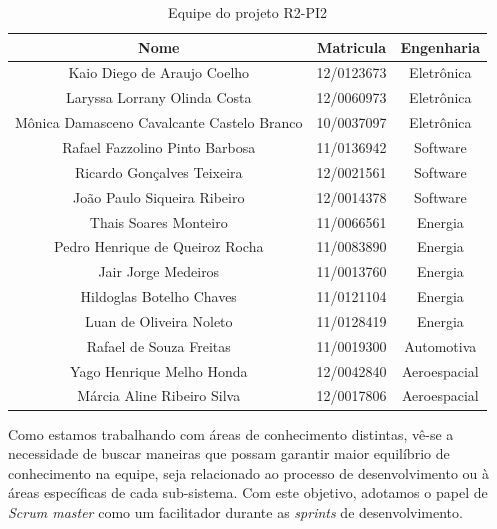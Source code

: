 	\begin{table}[H]
	\centering
	\caption{Equipe do projeto R2-PI2}
	\label{tab:equipe}
	\begin{tabular}{|c|c|c|}
	\hline
	\textbf{Nome}                              & \textbf{Matricula} & \textbf{Engenharia} \\ \hline
	Kaio Diego de Araujo Coelho                & 12/0123673         & Eletrônica          \\ \hline
	Laryssa Lorrany Olinda Costa               & 12/0060973         & Eletrônica          \\ \hline
	Mônica Damasceno Cavalcante Castelo Branco & 10/0037097         & Eletrônica          \\ \hline
	Rafael Fazzolino Pinto Barbosa             & 11/0136942         & Software            \\ \hline
	Ricardo Gonçalves Teixeira                 & 12/0021561         & Software            \\ \hline
	João Paulo Siqueira Ribeiro                & 12/0014378         & Software            \\ \hline
	Thais Soares Monteiro                      & 11/0066561         & Energia             \\ \hline
	Pedro Henrique de Queiroz Rocha            & 11/0083890         & Energia             \\ \hline
	Jair Jorge Medeiros                        & 11/0013760         & Energia             \\ \hline
	Hildoglas Botelho Chaves                   & 11/0121104         & Energia             \\ \hline
	Luan de Oliveira Noleto                    & 11/0128419         & Energia             \\ \hline
	Rafael de Souza Freitas                    & 11/0019300         & Automotiva          \\ \hline
	Yago Henrique Melho Honda                  & 12/0042840         & Aeroespacial        \\ \hline
	Márcia Aline Ribeiro Silva                 & 12/0017806         & Aeroespacial        \\ \hline
	\end{tabular}
	\end{table}

	Como estamos trabalhando com áreas de conhecimento distintas, vê-se a necessidade de buscar maneiras que possam garantir maior equilíbrio de conhecimento na equipe, seja relacionado ao processo de desenvolvimento ou à áreas específicas de cada sub-sistema. Com este objetivo, adotamos o papel de \textit{Scrum master} como um facilitador durante as \textit{sprints} de desenvolvimento.

